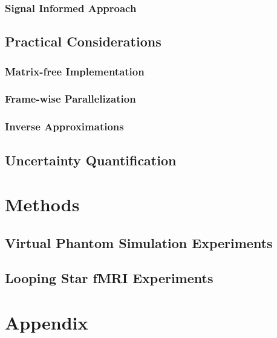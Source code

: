 \documentclass[11pt]{article}
\begin{document}
\subsubsection{Signal Informed Approach}

\subsection{Practical Considerations}

\subsubsection{Matrix-free Implementation}


\subsubsection{Frame-wise Parallelization}

\subsubsection{Inverse Approximations}

\subsection{Uncertainty Quantification}

\section{Methods}
\subsection{Virtual Phantom Simulation Experiments}
\subsection{Looping Star fMRI Experiments}

\section{Appendix}
\end{document}
